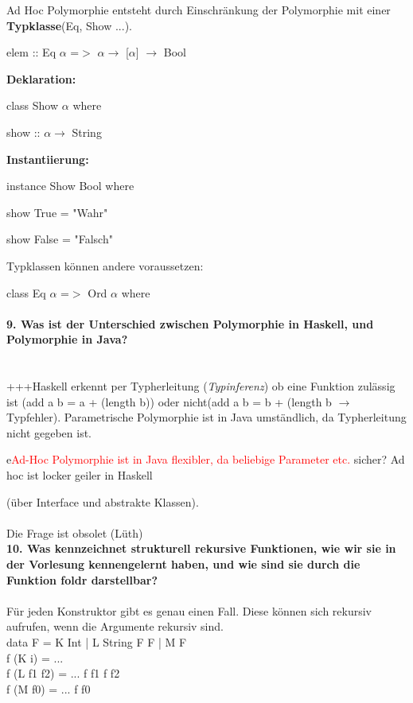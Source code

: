 \documentclass{article}
\begin{document}
Ad Hoc Polymorphie entsteht durch  Einschr\"ankung der Polymorphie mit einer \textbf{Typklasse}(Eq, Show ...).

elem :: Eq $\alpha$ =$>$ $\alpha \rightarrow$ [$\alpha$] $\rightarrow$ Bool

\textbf{Deklaration:}

class Show $\alpha$ where

show :: $\alpha \rightarrow$ String

\textbf{Instantiierung:}

instance Show Bool where

show True = "Wahr"

show False = "Falsch"

Typklassen können andere voraussetzen:

class Eq $\alpha$ =$>$ Ord $\alpha$ where
\\
\\
\textbf{9. Was ist der Unterschied zwischen Polymorphie in Haskell, und Polymorphie in Java?}
\\
\\
\\
+++Haskell erkennt per Typherleitung (\textit{Typinferenz}) ob eine Funktion zul\"assig ist (add a b = a  + (length b)) oder nicht(add a b = b  + (length b $\rightarrow$ Typfehler).
Parametrische Polymorphie ist in Java umst\"andlich, da Typherleitung nicht gegeben ist.

e\textcolor{red}{Ad-Hoc Polymorphie ist in Java flexibler, da beliebige Parameter etc.} sicher? Ad hoc ist locker geiler in Haskell

(über Interface und abstrakte Klassen).
\\
\\
Die Frage ist obsolet (Lüth)
\\
\textbf{10. Was kennzeichnet strukturell rekursive Funktionen, wie wir sie in der Vorlesung kennengelernt haben, und wie sind sie durch die Funktion foldr darstellbar?}
\\
\\
Für jeden Konstruktor gibt es genau einen Fall. Diese können sich rekursiv aufrufen, wenn die Argumente rekursiv sind. \\

data F = K Int | L String  F F | M F\\

f (K i) = ...\\
f (L f1 f2) = ... f f1 f f2\\
f (M f0) = ... f f0\\
\end{document}
